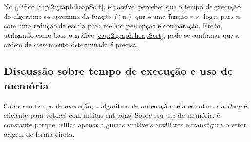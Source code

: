 No gráfico \ref{cap:2:graph:heapSort}, é possível perceber que o tempo de execução do algoritmo se aproxima
da função $f(n)$ que é uma função $n \times \log n$ para $n$ com uma redução de escala para melhor percepção e comparação. Então,
utilizando como base o gráfico \ref{cap:2:graph:heapSort}, pode-se confirmar que a ordem de crescimento determinada é
precisa.

\subsection{Discussão sobre tempo de execução e uso de memória}

Sobre seu tempo de execução, o algoritmo de ordenação pela estrutura da \textit{Heap} é eficiente para
vetores com muitas entradas. Sobre seu uso de memória, é constante porque utiliza apenas algumas variáveis
auxiliares e transfigura o vetor origem de forma direta.

